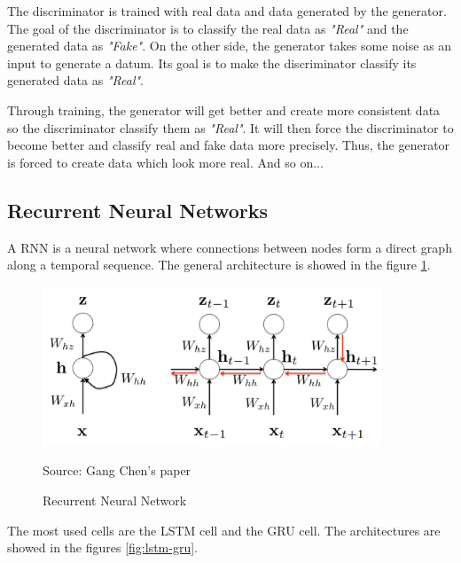 \documentclass[12pt]{report}
\begin{document}
The discriminator is trained with real data and data generated by the generator.
The goal of the discriminator is to classify the real data as \textit{"Real"} and the generated data as \textit{"Fake"}.
On the other side, the generator takes some noise as an input to generate a datum.
Its goal is to make the discriminator classify its generated data as \textit{"Real"}.

Through training, the generator will get better and create more consistent data so the discriminator classify them as \textit{"Real"}.
It will then force the discriminator to become better and classify real and fake data more precisely.
Thus, the generator is forced to create data which look more real.
And so on...

\subsection{Recurrent Neural Networks}
\label{sec:back:rnn}

A RNN \cite{chen_gentle_2018} is a neural network where connections between nodes form a direct graph along a temporal sequence. The general architecture is showed in the figure \ref{fig:rnn}.

\begin{figure}[htbp]
    \centering
    \includegraphics[width=0.9\textwidth]{images/nn/architectures/rnn.jpg}
    \caption{Recurrent Neural Network}
    Source: Gang Chen's paper \cite{chen_gentle_2018}
    \label{fig:rnn}
\end{figure}

The most used cells are the LSTM cell and the GRU cell. The architectures are showed in the figures \ref{fig:lstm-gru}.
\end{document}
